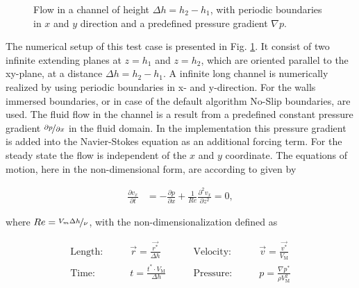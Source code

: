 \begin{figure}[!bp]
  \begin{minipage}[c]{0.6\textwidth}
      \centering
  \end{minipage}
  \begin{minipage}[c]{0.3\textwidth}
      \caption{Flow in a channel of height $\Delta h = h_2 - h_1$, with periodic boundaries in $x$ and $y$ direction and
       a predefined pressure gradient $\nabla p$.
      \label{validation:setup_pf}
      }
  \end{minipage}
\end{figure}

The numerical setup of this test case is presented in Fig. \ref{validation:setup_pf}.
It consist of two infinite extending  planes at $z=h_1$ and $z=h_2$, which are oriented
parallel to the xy-plane, at a distance $\Delta h = h_2 - h_1$.
A infinite long channel is numerically realized by using periodic boundaries in x- and y-direction.
For the walls immersed boundaries, or in case of the default algorithm No-Slip boundaries, are used.
The fluid flow in the channel is a result from a predefined constant pressure gradient $\nicefrac{\partial p}{\partial x}$
in the fluid domain.
In the implementation this pressure gradient is added into the Navier-Stokes equation as an additional forcing term.
For the steady state the flow is independent of the $x$ and $y$ coordinate.
The equations of motion, here in the non-dimensional form, are according to \citep{Kundu2012} given by

\begin{align}
    \label{vali:pflow_navstok}
    \frac{\partial v_x}{\partial t} &= - \frac{\partial p}{\partial x}
     + \frac{1}{Re} \frac{\partial^2 v_x}{\partial z^2} = 0,
\end{align}

where $Re = \nicefrac{V_{m}\Delta h}{\nu}$, with the non-dimensionalization defined as

\begin{align}
    \text{Length:}\qquad &  \vec{r} = \frac{\vec{r^*}}{\Delta h}  &
    \qquad \text{Velocity:}\qquad& \vec{v} =  \frac{\vec{v^*}}{V_{\text{M}}}\\
    \text{Time:}  \qquad & t = \frac{t^* \cdot V_\text{M}}{\Delta h}&
    \qquad  \text{Pressure:}\qquad & p = \frac{\nabla p^*}{\rho V_\text{M}^2}
\end{align}

